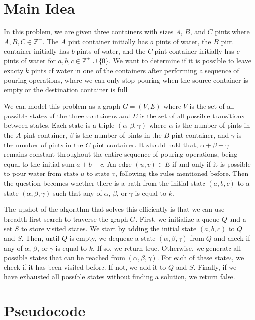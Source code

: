 \documentclass{article}
\begin{document}
\section{Main Idea}
In this problem, we are given three containers with sizes $A$, $B$, and $C$ pints where $A, B, C \in \mathbb{Z}^+$.
The $A$ pint container initially has $a$ pints of water, the $B$ pint container initially has $b$ pints of water, and the $C$ pint container initially has $c$ pints of water for $a, b, c \in \mathbb{Z}^+ \cup \{0\}$.
We want to determine if it is possible to leave exacty $k$ pints of water in one of the containers after performing a sequence of pouring operations, where we can only stop pouring when the source container is empty or the destination container is full.

We can model this problem as a graph $G = (V, E)$ where $V$ is the set of all possible states of the three containers and $E$ is the set of all possible transitions between states.
Each state is a triple $(\alpha, \beta, \gamma)$ where $\alpha$ is the number of pints in the $A$ pint container, $\beta$ is the number of pints in the $B$ pint container, and $\gamma$ is the number of pints in the $C$ pint container.
It should hold that, $\alpha + \beta + \gamma$ remains constant throughout the entire sequence of pouring operations, being equal to the initial sum $a + b + c$.
An edge $(u, v) \in E$ if and only if it is possible to pour water from state $u$ to state $v$, following the rules mentioned before.
Then the question becomes whether there is a path from the initial state $(a, b, c)$ to a state $(\alpha, \beta, \gamma)$ such that any of $\alpha$, $\beta$, or $\gamma$ is equal to $k$.

The upshot of the algorithm that solves this efficiently is that we can use breadth-first search to traverse the graph $G$.
First, we initialize a queue $Q$ and a set $S$ to store visited states.
We start by adding the initial state $(a, b, c)$ to $Q$ and $S$.
Then, until $Q$ is empty, we dequeue a state $(\alpha, \beta, \gamma)$ from $Q$ and check if any of $\alpha$, $\beta$, or $\gamma$ is equal to $k$.
If so, we return true.
Otherwise, we generate all possible states that can be reached from $(\alpha, \beta, \gamma)$.
For each of these states, we check if it has been visited before.
If not, we add it to $Q$ and $S$.
Finally, if we have exhausted all possible states without finding a solution, we return false.

\section{Pseudocode}
\end{document}
